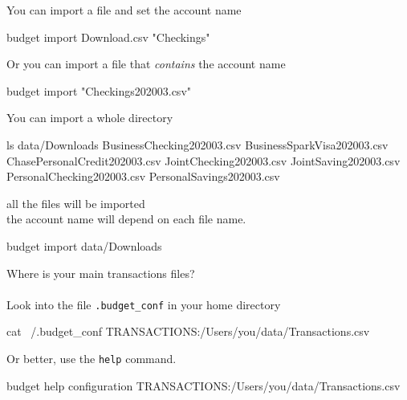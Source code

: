 \documentclass[12pt,letterpaper]{article}
\begin{document}
\begin{framed}
    \begin{minipage}[t][3in][t]{5in}
        \Large
        You can import a file and set the account name\\
        \begin{budget}
            budget import Download.csv "Checkings"
        \end{budget}
        Or you can import a file that \emph{contains} the account name\\
        \begin{budget}
            budget import "Checkings202003.csv"
        \end{budget}
    \end{minipage}
\end{framed}
\begin{framed}
    \begin{minipage}[t][3in][t]{5in}
        \Large
        You can import a whole directory \\
        \normalsize
        \begin{budget}
ls data/Downloads 
BusinessChecking202003.csv
BusinessSparkVisa202003.csv
ChasePersonalCredit202003.csv
JointChecking202003.csv
JointSaving202003.csv
PersonalChecking202003.csv
PersonalSavings202003.csv
        \end{budget}
        all the files will be imported\\
        the account name will depend on each file name. 
        \begin{budget}
            budget import data/Downloads
        \end{budget}
    \end{minipage}
\end{framed}
\begin{framed}
    \begin{minipage}[t][3in][t]{5in}
        \Large
        Where is your main transactions files?\\ \\
Look into the file \lstinline[language=budget,basicstyle=\Large]!.budget_conf! in your home directory 
\normalsize
        \begin{budget}
            cat ~/.budget_conf
            TRANSACTIONS:/Users/you/data/Transactions.csv
        \end{budget}
        \Large
        Or better, use the \lstinline[language=budget,basicstyle=\Large]!help! command.
        \begin{budget}
            budget help configuration 
            TRANSACTIONS:/Users/you/data/Transactions.csv
        \end{budget}
    \end{minipage}
\end{framed}
\end{document}
